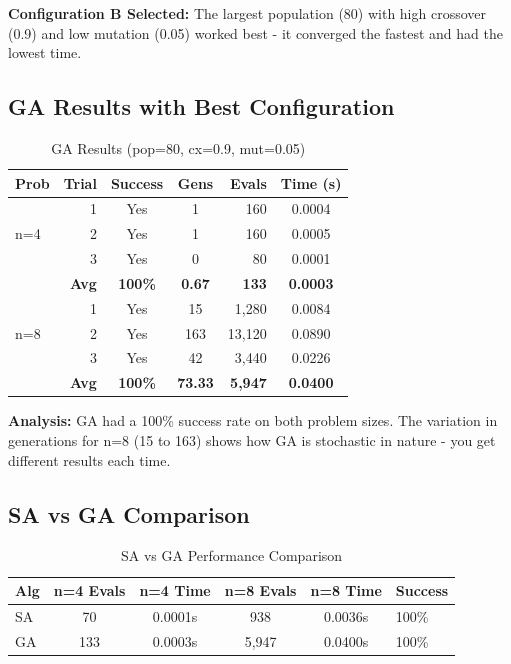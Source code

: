 \documentclass[letterpaper]{article}
\begin{document}
\textbf{Configuration B Selected:} The largest population (80) with high crossover (0.9) and low mutation (0.05) worked best - it converged the fastest and had the lowest time.

\subsection{GA Results with Best Configuration}

\begin{table}[h]
\centering
\tiny
\begin{tabular}{lrccrc}
\toprule
\textbf{Prob} & \textbf{Trial} & \textbf{Success} & \textbf{Gens} & \textbf{Evals} & \textbf{Time (s)} \\
\midrule
\multirow{3}{*}{n=4} & 1 & Yes & 1 & 160 & 0.0004 \\
& 2 & Yes & 1 & 160 & 0.0005 \\
& 3 & Yes & 0 & 80 & 0.0001 \\
\cmidrule{2-6}
& \textbf{Avg} & \textbf{100\%} & \textbf{0.67} & \textbf{133} & \textbf{0.0003} \\
\midrule
\multirow{3}{*}{n=8} & 1 & Yes & 15 & 1,280 & 0.0084 \\
& 2 & Yes & 163 & 13,120 & 0.0890 \\
& 3 & Yes & 42 & 3,440 & 0.0226 \\
\cmidrule{2-6}
& \textbf{Avg} & \textbf{100\%} & \textbf{73.33} & \textbf{5,947} & \textbf{0.0400} \\
\bottomrule
\end{tabular}
\caption{GA Results (pop=80, cx=0.9, mut=0.05)}
\end{table}

\textbf{Analysis:} GA had a 100\% success rate on both problem sizes. The variation in generations for n=8 (15 to 163) shows how GA is stochastic in nature - you get different results each time.

\subsection{SA vs GA Comparison}

\begin{table}[h]
\centering
\tiny
\begin{tabular}{lccccl}
\toprule
\textbf{Alg} & \textbf{n=4 Evals} & \textbf{n=4 Time} & \textbf{n=8 Evals} & \textbf{n=8 Time} & \textbf{Success} \\
\midrule
SA & 70 & 0.0001s & 938 & 0.0036s & 100\% \\
GA & 133 & 0.0003s & 5,947 & 0.0400s & 100\% \\
\bottomrule
\end{tabular}
\caption{SA vs GA Performance Comparison}
\end{table}
\end{document}
